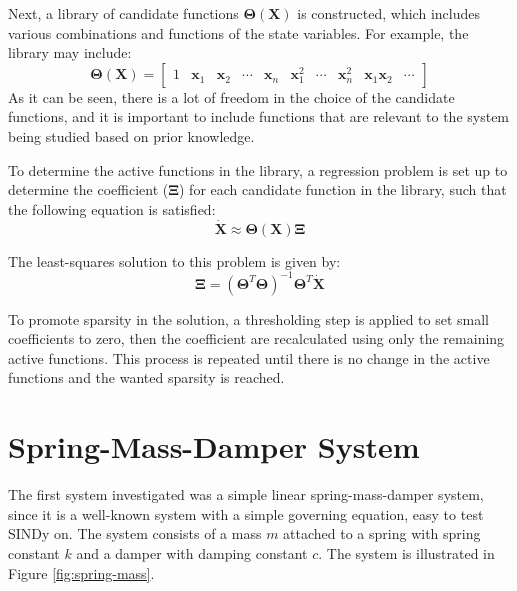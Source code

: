 ﻿\documentclass[12pt,a4paper]{article}
\begin{document}
Next, a library of candidate functions $\bm{\Theta}(\bm{X})$ is constructed, which includes
various combinations and functions of the state variables. For example, the library may include:
\begin{equation}   
    \bm{\Theta}(\bm{X}) = \begin{bmatrix}
    1 & \bm{x}_1 & \bm{x}_2 & \cdots & \bm{x}_n & \bm{x}_1^2 & \cdots & \bm{x}_n^2 &
    \bm{x}_1\bm{x}_2 & \cdots 
    \end{bmatrix}
\end{equation}
As it can be seen, there is a lot of freedom in the choice of the candidate functions, 
and it is important to include functions that are relevant to the system being studied
based on prior knowledge.\par

To determine the active functions in the library, a regression problem is set up to
determine the coefficient ($\bm{\Xi}$) for each candidate function in the library, 
such that the following equation is satisfied:
\begin{equation}
    \dot{\bm{X}} \approx \bm{\Theta}(\bm{X})\bm{\Xi}
\end{equation}

The least-squares solution to this problem is given by:
\begin{equation}
    \bm{\Xi} = (\bm{\Theta}^T\bm{\Theta})^{-1}\bm{\Theta}^T\dot{\bm{X}}
\end{equation}

To promote sparsity in the solution, a thresholding step is applied to
set small coefficients to zero, then the coefficient are recalculated
using only the remaining active functions. This process is repeated until there is
no change in the active functions and the wanted sparsity is reached.\par

\section{Spring-Mass-Damper System}
The first system investigated was a simple linear spring-mass-damper system,
since it is a well-known system with a simple governing equation,
easy to test SINDy on. The system consists of a mass $m$ attached to a spring
with spring constant $k$ and a damper with damping constant $c$.
The system is illustrated in Figure \ref{fig:spring-mass}.\par
\end{document}
